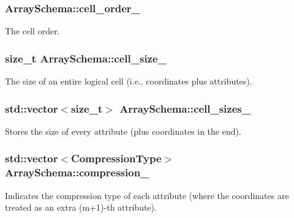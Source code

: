\subsubsection[{cell\+\_\+order\+\_\+}]{ Array\+Schema\+::cell\+\_\+order\+\_\+\hspace{0.3cm}{\ttfamily [private]}}\label{classArraySchema_af067d28d340153d911fe3252d100588d}
The cell order. \hypertarget{classArraySchema_a1dc5a12c70b7101ed06e23d9c4ed35c6}{}
\subsubsection[{cell\+\_\+size\+\_\+}]{\setlength{\rightskip}{0pt plus 5cm}size\+\_\+t Array\+Schema\+::cell\+\_\+size\+\_\+\hspace{0.3cm}{\ttfamily [private]}}\label{classArraySchema_a1dc5a12c70b7101ed06e23d9c4ed35c6}
The size of an entire logical cell (i.\+e., coordinates plus attributes). \hypertarget{classArraySchema_a0ec47aa5b59bd1d738aecb57ec57fac5}{}
\subsubsection[{cell\+\_\+sizes\+\_\+}]{\setlength{\rightskip}{0pt plus 5cm}std\+::vector$<$size\+\_\+t$>$ Array\+Schema\+::cell\+\_\+sizes\+\_\+\hspace{0.3cm}{\ttfamily [private]}}\label{classArraySchema_a0ec47aa5b59bd1d738aecb57ec57fac5}
Stores the size of every attribute (plus coordinates in the end). \hypertarget{classArraySchema_a7ac8416f05a69e7b0d154e0d2c16733b}{}
\subsubsection[{compression\+\_\+}]{\setlength{\rightskip}{0pt plus 5cm}std\+::vector$<${\bf Compression\+Type}$>$ Array\+Schema\+::compression\+\_\+\hspace{0.3cm}{\ttfamily [private]}}\label{classArraySchema_a7ac8416f05a69e7b0d154e0d2c16733b}
Indicates the compression type of each attribute (where the coordinates are treated as an extra (m+1)-\/th attribute). \hypertarget{classArraySchema_aa04ac8362f27d541057201dc78a78dc1}{}
